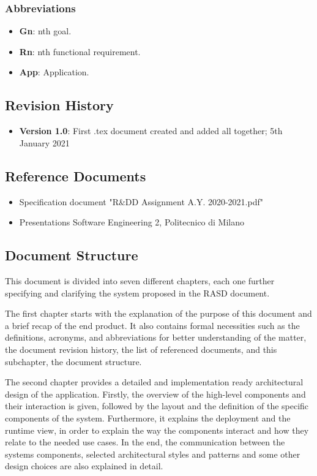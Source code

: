 \subsubsection{Abbreviations}
\begin{itemize}
	\item \textbf{Gn}: nth goal.
	\item \textbf{Rn}: nth functional requirement.
	\item \textbf{App}: Application.
\end{itemize}

\newpage
\subsection{Revision History}
\begin{itemize}
	\item \textbf{Version 1.0}: First .tex document created and added all together; 5th January 2021
\end{itemize}

\newpage
\subsection{Reference Documents}
\begin{itemize}
	\item Specification document "R\&DD Assignment A.Y. 2020-2021.pdf"
	\item Presentations Software Engineering 2, Politecnico di Milano
\end{itemize}

\newpage
\subsection{Document Structure}
\hspace{\parindent} This document is divided into seven different chapters, each one further specifying and clarifying the system proposed in the RASD document. \newline

The first chapter starts with the explanation of the purpose of this document and a brief recap of the end product. It also contains formal necessities such as the definitions, acronyms, and abbreviations for better understanding of the matter, the document revision history, the list of referenced documents, and this subchapter, the document structure. \newline 

The second chapter provides a detailed and implementation ready architectural design of the application. Firstly, the overview of the high-level components and their interaction is given, followed by the layout and the definition of the specific components of the system. Furthermore, it explains the deployment and the runtime view, in order to explain the way the components interact and how they relate to the needed use cases. In the end, the communication between the systems components, selected architectural styles and patterns and some other design choices are also explained in detail. \newline

